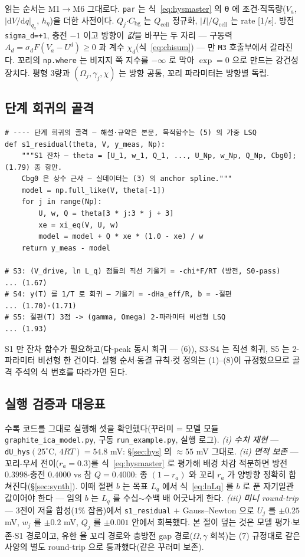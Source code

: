 \documentclass[11pt,a4paper]{article}
\newcommand{\dd}{\mathrm{d}}
\newcommand{\cell}{\mathrm{cell}}
\newcommand{\bg}{\mathrm{bg}}
\begin{document}
읽는 순서는 M1$\to$M6 그대로다. \texttt{par} 는 식~\eqref{eq:hysmaster} 의 $\bm\theta$ 에 조건$\cdot$직독량($V_a$, $|\dd V/\dd q|_{q_a}$, $h_\eta$)을 더한 사전이다. $Q_j$$\cdot$$C_\bg$ 는 $Q_\cell$ 정규화, $|I|/Q_\cell$ 는 rate [1/s]. 방전 \texttt{sigma\_d=+1}, 충전 $-1$ 이고 방향이 \emph{값}을 바꾸는 두 자리 — 구동력 $A_d=\sigma_dF(V_a-U^d)\ge0$ 과 계수 $\chi_d$(식~\eqref{eq:chisum}) — 만 \texttt{M3} 호출부에서 갈라진다. 꼬리의 \texttt{np.where} 는 비지지 쪽 지수를 $-\infty$ 로 막아 $\exp=0$ 으로 만드는 강건성 장치다. 평형 3량과 $(\Omega_j,\gamma_j,\chi)$ 는 방향 공통, 꼬리 파라미터는 방향별 독립.

\subsection{단계 회귀의 골격}\label{sec:codestage}
\begin{small}
\begin{verbatim}
# ---- 단계 회귀의 골격 — 해설·규약은 본문, 목적함수는 (5) 의 가중 LSQ
def s1_residual(theta, V, y_meas, Np):
    """S1 잔차 — theta = [U_1, w_1, Q_1, ..., U_Np, w_Np, Q_Np, Cbg0]; (1.79) 종 항만.
    Cbg0 은 상수 근사 — 실데이터는 (3) 의 anchor spline."""
    model = np.full_like(V, theta[-1])
    for j in range(Np):
        U, w, Q = theta[3 * j:3 * j + 3]
        xe = xi_eq(V, U, w)
        model = model + Q * xe * (1.0 - xe) / w
    return y_meas - model

# S3: (V_drive, ln L_q) 점들의 직선 기울기 = -chi*F/RT (방전, S0-pass)      ... (1.67)
# S4: y(T) 를 1/T 로 회귀 — 기울기 = -dHa_eff/R, b = -절편                  ... (1.70)·(1.71)
# S5: 절편(T) 3점 -> (gamma, Omega) 2-파라미터 비선형 LSQ                   ... (1.93)
\end{verbatim}
\end{small}
S1 만 잔차 함수가 필요하고(다-peak 동시 회귀 — (6)), S3$\cdot$S4 는 직선 회귀, S5 는 2-파라미터 비선형 한 건이다. 실행 순서$\cdot$동결 규칙$\cdot$컷 정의는 (1)--(8)이 규정했으므로 골격 주석의 식 번호를 따라가면 된다.

\subsection{실행 검증과 대응표}\label{sec:codeverify}
수록 코드를 그대로 실행해 셋을 확인했다(꾸러미 = 모델 모듈 \texttt{graphite\_ica\_model.py}, 구동 \texttt{run\_example.py}, 실행 로그).
\emph{(i) 수치 재현} — \texttt{dU\_hys}$(25^\circ\mathrm C,\,4RT)=54.8$ mV: \S\ref{sec:hys} 의 $\approx55$ mV 그대로.
\emph{(ii) 면적 보존} — 꼬리-우세 전이($r_a=0.3$)를 식~\eqref{eq:hysmaster} 로 평가해 배경 차감 적분하면 방전 $0.3998$$\cdot$충전 $0.4000$ vs 참 $Q=0.4000$: 종 $(1-r_a)$ 와 꼬리 $r_a$ 가 양방향 정확히 합쳐진다(\S\ref{sec:synth}). 이때 절편 $b$ 는 목표 $L_q$ 에서 식~\eqref{eq:lnLq} 를 $b$ 로 푼 자기일관 값이어야 한다 — 임의 $b$ 는 $L_q$ 를 수십$\sim$수백 배 어긋나게 한다.
\emph{(iii) 미니 round-trip} — 3전이 저율 합성($1\%$ 잡음)에서 \texttt{s1\_residual} $+$ Gauss--Newton 으로 $U_j$ 를 $\pm0.25$ mV, $w_j$ 를 $\pm0.2$ mV, $Q_j$ 를 $\pm0.001$ 안에서 회복했다. 본 절이 덮는 것은 모델 평가$\cdot$보존$\cdot$S1 경로이고, 유한 율 꼬리 경로와 충방전 gap 경로($\Omega,\gamma$ 회복)는 (7) 규정대로 같은 사양의 별도 round-trip 으로 통과했다(같은 꾸러미 보존).
\end{document}
